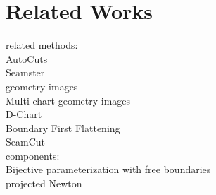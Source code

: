 \section{Related Works}

related methods:\\
AutoCuts~\cite{Poranne2017Autocuts}\\
Seamster~\cite{Sheffer2002Seamster}\\
geometry images~\cite{Gu2002Geometry}\\
Multi-chart geometry images~\cite{Snyder2003Multi}\\
D-Chart~\cite{Julius2005D}\\
Boundary First Flattening~\cite{Sawhney:2017}\\
SeamCut~\cite{Lucquin:2017}\\

components:\\
Bijective parameterization with free boundaries~\cite{Smith2015Bijective}\\
projected Newton~\cite{Teran2005Robust}\\
\\